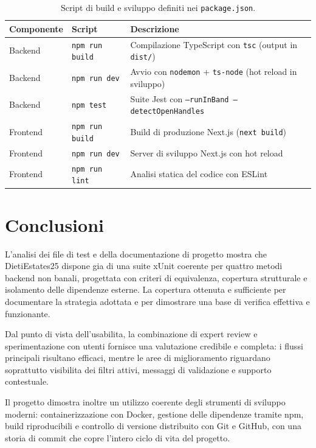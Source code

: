 \documentclass[a4paper,11pt]{article}
\begin{document}
\begin{table}[H]
\centering
\begin{tabularx}{\textwidth}{@{}l l X@{}}
\toprule
Componente & Script & Descrizione \\
\midrule
Backend & \texttt{npm run build} & Compilazione TypeScript con \texttt{tsc} (output in \texttt{dist/}) \\
Backend & \texttt{npm run dev} & Avvio con \texttt{nodemon} + \texttt{ts-node} (hot reload in sviluppo) \\
Backend & \texttt{npm test} & Suite Jest con \texttt{--runInBand --detectOpenHandles} \\
Frontend & \texttt{npm run build} & Build di produzione Next.js (\texttt{next build}) \\
Frontend & \texttt{npm run dev} & Server di sviluppo Next.js con hot reload \\
Frontend & \texttt{npm run lint} & Analisi statica del codice con ESLint \\
\bottomrule
\end{tabularx}
\caption{Script di build e sviluppo definiti nei \texttt{package.json}.}
\label{tab:build-scripts}
\end{table}

\section{Conclusioni}
L'analisi dei file di test e della documentazione di progetto mostra che DietiEstates25 dispone gia di una suite xUnit coerente per quattro metodi backend non banali, progettata con criteri di equivalenza, copertura strutturale e isolamento delle dipendenze esterne. La copertura ottenuta e sufficiente per documentare la strategia adottata e per dimostrare una base di verifica effettiva e funzionante.

Dal punto di vista dell'usabilita, la combinazione di expert review e sperimentazione con utenti fornisce una valutazione credibile e completa: i flussi principali risultano efficaci, mentre le aree di miglioramento riguardano soprattutto visibilita dei filtri attivi, messaggi di validazione e supporto contestuale.

Il progetto dimostra inoltre un utilizzo coerente degli strumenti di sviluppo moderni: containerizzazione con Docker, gestione delle dipendenze tramite npm, build riproducibili e controllo di versione distribuito con Git e GitHub, con una storia di commit che copre l'intero ciclo di vita del progetto.
\end{document}
